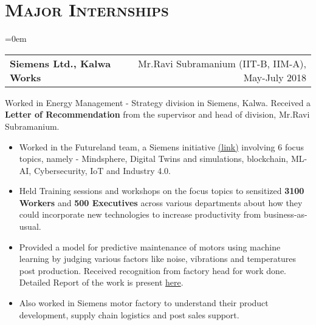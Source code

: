 \documentclass{article}
\makeatletter
\newcommand{\headerrow}[2]
{\begin{tabular*}{\linewidth}{l@{\extracolsep{\fill}}r}
	#1 &
	#2 \\
\end{tabular*}}
\newcommand{\tmpsection}[1]{}
\let\tmpsection=\section
\renewcommand{\section}[1]{\tmpsection*{\textsc{#1}}}
\makeatother
\begin{document}
\section{Major Internships}
\begin{list} {}{\leftmargin=0em}
\setlength{\leftmargin}{0pt}

    \item[]
    \headerrow {\textbf{Siemens Ltd., Kalwa Works }}{Mr.Ravi Subramanium (IIT-B, IIM-A), May-July 2018}
    Worked in Energy Management - Strategy division in Siemens, Kalwa. Received a \textbf{Letter of Recommendation} from the supervisor and head of division, Mr.Ravi Subramanium.
    \begin{itemize}
    \setlength\itemsep{0.0em}
        \item Worked in the Futureland team, a Siemens initiative \href{https://www.siemens.com/global/en/home/company/fairs-events/futureland.html}{(link)} involving 6 focus topics, namely - Mindsphere, Digital Twins and simulations, blockchain, ML-AI, Cybersecurity, IoT and Industry 4.0.
        \item Held Training sessions and workshops on the focus topics to sensitized \textbf{3100 Workers} and \textbf{500 Executives} across various departments about how they could incorporate new technologies to increase productivity from business-as-usual. 
        \item Provided a model for predictive maintenance of motors using machine learning by judging various factors like noise, vibrations and temperatures post production. Received recognition from factory head for work done. Detailed Report of the work is present \href{https://csciitd-my.sharepoint.com/:b:/g/personal/ee1170938_csciitd_onmicrosoft_com/EasUavDrTmdFrvuYc0rOissBYh8X1WvKKr_OTclVrCd42w?e=wCPjfb}{here}.
    \item Also worked in Siemens motor factory to understand their product development, supply chain logistics and post sales support. 
    \end{itemize}


\end{list}
\end{document}
